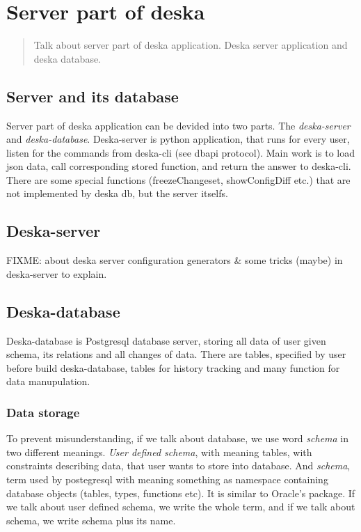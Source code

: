 \documentclass[deska]{subfiles}
\begin{document}
\chapter{Server part of deska}
\label{sec:deska-server}

\begin{abstract}
Talk about server part of deska application. Deska server application and deska database.
\end{abstract}

\section{Server and its database}
Server part of deska application can be devided into two parts. The {\em deska-server} and {\em deska-database}.
Deska-server is python application, that runs for every user, listen for the commands from deska-cli (see dbapi protocol).
Main work is to load json data, call corresponding stored function, and return the answer to deska-cli.
There are some special functions (freezeChangeset, showConfigDiff etc.) that are not implemented by deska db, but the server itselfs.

\section{Deska-server}
FIXME: about deska server configuration generators & some tricks (maybe) in deska-server to explain.

\section{Deska-database}
Deska-database is Postgresql database server, storing all data of user given schema, its relations and all changes of data.
There are tables, specified by user before build deska-database, tables for history tracking and many function for data manupulation.

\subsection{Data storage}
To prevent misunderstanding, if we talk about database, we use word {\em schema} in two different meanings. {\em User defined schema},
with meaning tables, with constraints describing data, that user wants to store into database. And {\em schema}, term used by
postegresql with meaning something as namespace containing database objects (tables, types, functions etc).
It is similar to Oracle's package. If we talk about user defined schema, we write the whole term, and if we talk about schema, we write
schema plus its name.
\end{document}
